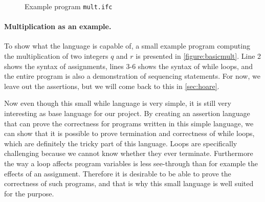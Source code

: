 \begin{figure}

\caption{Example program \texttt{mult.ifc}}
\label{figure:basicmult}
\end{figure}

\paragraph{Multiplication as an example.}
To show what the language is capable of, a small example program computing the multiplication of two integers $q$ and $r$ is presented in \autoref{figure:basicmult}. Line 2 shows the syntax of assignments, lines $3$-$6$ shows the syntax of while loops, and the entire program is also a demonstration of sequencing statements.
For now, we leave out the assertions, but we will come back to this in \autoref{sec:hoare}.

Now even though this small while language is very simple, it is still very interesting as base language for our project.
By creating an assertion language that can prove the correctness for programs written in this simple language, we can show that it is possible to prove termination and correctness of while loops, which are definitely the tricky part of this language.
Loops are specifically challenging because we cannot know whether they ever terminate. Furthermore the way a loop affects program variables is less see-through than for example the effects of an assignment.
Therefore it is desirable to be able to prove the correctness of such programs, and that is why this small language is well suited for the purpose.
